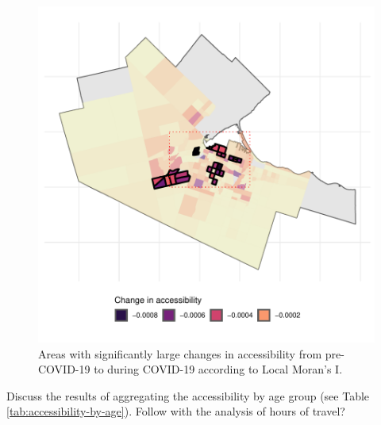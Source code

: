 \documentclass[]{elsarticle} %
\begin{document}
\begin{figure}
\includegraphics[width=1\linewidth]{Accessibility-Foodbanks-Hamilton_files/figure-latex/plot-local-i-1} \caption{\label{fig:plot-local-i}Areas with significantly large changes in accessibility from pre-COVID-19 to during COVID-19 according to Local Moran's I.}\label{fig:plot-local-i}
\end{figure}

Discuss the results of aggregating the accessibility by age group (see
Table \ref{tab:accessibility-by-age}). Follow with the analysis of hours
of travel?
\end{document}

